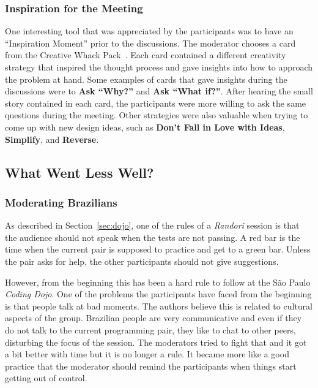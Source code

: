 \subsubsection{Inspiration for the Meeting}

One interesting tool that was appreciated by the participants was
to have an ``Inspiration Moment'' prior to the discussions. The moderator
chooses a card from the Creative Whack Pack~\cite{Creative}. Each
card contained a different creativity strategy that inspired the thought
process and gave insights into how to approach the problem at hand. Some
examples of cards that gave insights during the discussions were to
\textbf{Ask ``Why?''} and \textbf{Ask ``What if?''}. After hearing the
small story contained in each card, the participants were more willing
to ask the same questions during the meeting. Other strategies were also
valuable when trying to come up with new design ideas, such as \textbf{Don't
Fall in Love with Ideas}, \textbf{Simplify}, and \textbf{Reverse}. 

\subsection{What Went Less Well?}\label{ssub:less_well}

\subsubsection{Moderating Brazilians}

As described in Section~\ref{sec:dojo}, one of the rules of a
\emph{Randori} session is that the audience should not speak when
the tests are not passing. A red bar is the time when the current
pair is supposed to practice and get to a green bar. Unless the pair
asks for help, the other participants should not give suggestions.

However, from the beginning this has been a hard rule to follow at
the São Paulo \emph{Coding Dojo}. One of the problems the participants
have faced from the beginning is that people talk at bad moments. The authors
believe this is related to cultural aspects of the group. Brazilian people are
very communicative and even if they do not talk to the current programming
pair, they like to chat to other peers, disturbing the focus of the session.
The moderators tried to fight that and it got a bit better with time but it is no
longer a rule. It became more like a good practice that the moderator should
remind the participants when things start getting out of control.

